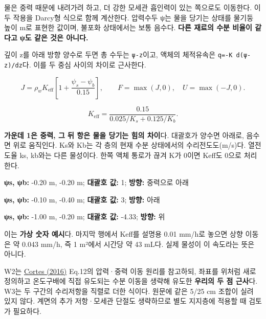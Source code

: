 \documentclass[11pt,a4paper]{article}
\begin{document}
물은 중력 때문에 내려가려 하고, 더 강한 모세관 흡인력이 있는 쪽으로도 이동한다. 이 두 작용을 Darcy형 식으로 함께 계산한다. 압력수두 ψ는 물을 당기는 상태를 물기둥 높이 m로 표현한 값이며, 불포화 상태에서는 보통 음수다. \textbf{다른 재료의 수분 비율이 같다고 ψ도 같은 것은 아니다.}

깊이 z를 아래 방향 양수로 두면 총 수두는 \texttt{ψ-z}이고, 액체의 체적유속은 \texttt{q=-K d(ψ-z)/dz}다. 이를 두 중심 사이의 차이로 근사한다.

\begin{equation*}
J=\rho_wK_{\mathrm{eff}}\left[1+\frac{\psi_s-\psi_b}{0.15}\right],
\qquad F=\max(J,0),\quad U=\max(-J,0).\tag{W2}
\end{equation*}

\begin{equation*}
K_{\mathrm{eff}}=\frac{0.15}{0.025/K_s+0.125/K_b}.\tag{W3}
\end{equation*}

\textbf{가운데 1은 중력, 그 뒤 항은 물을 당기는 힘의 차이}다. 대괄호가 양수면 아래로, 음수면 위로 움직인다. Ks와 Kb는 각 층의 현재 수분 상태에서의 수리전도도(m/s)다. 열전도율 ks, kb와는 다른 물성이다. 한쪽 액체 통로가 끊겨 K가 0이면 Keff도 0으로 처리한다.

\begin{description}[leftmargin=0pt,style=nextline]
\item[위아래 흡인력 같음] \textbf{ψs, ψb:} -0.20 m, -0.20 m; \textbf{대괄호 값:} 1; \textbf{방향:} 중력으로 아래
\item[위층이 더 젖고 아래가 더 강하게 당김] \textbf{ψs, ψb:} -0.10 m, -0.40 m; \textbf{대괄호 값:} 3; \textbf{방향:} 아래
\item[위층이 더 강하게 당김] \textbf{ψs, ψb:} -1.00 m, -0.20 m; \textbf{대괄호 값:} -4.33; \textbf{방향:} 위
\end{description}

이는 \textbf{가상 숫자 예시}다. 마지막 행에서 Keff를 설명용 0.01 mm/h로 놓으면 상향 이동은 약 0.043 mm/h, 즉 1 m²에서 시간당 약 43 mL다. 실제 물성이 이 속도라는 뜻은 아니다.

W2는 \href{\detokenize{https://www.jstage.jst.go.jp/article/taiki/51/2/51_103/_pdf/-char/en}}{Cortes (2016)} Eq.12의 압력·중력 이동 원리를 참고하되, 좌표를 위처럼 새로 정의하고 온도구배에 직접 유도되는 수분 이동을 생략해 유도한 \textbf{우리의 두 점 근사}다. W3는 두 구간의 수리저항을 직렬로 더한 식이다. 원문에 같은 5/25 cm 조합이 실려 있지 않다. 계면의 추가 저항·모세관 단절도 생략하므로 별도 지지층에 적용할 때 검토가 필요하다.
\end{document}
